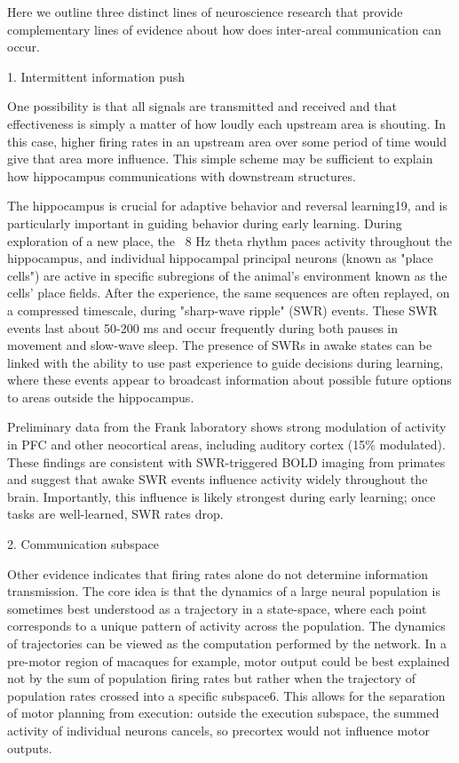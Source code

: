 \documentclass[12pt]{report}
\begin{document}
Here we outline three distinct lines of neuroscience research that provide 
complementary lines of evidence about how does inter-areal communication can
occur.

1. Intermittent information push

One possibility is that all signals are transmitted and received and that
effectiveness is simply a matter of how loudly each upstream area is shouting.
In this case, higher firing rates in an upstream area over some period of time
would give that area more influence. This simple scheme may be sufficient to
explain how hippocampus communications with downstream structures. 

The hippocampus is crucial for adaptive behavior and reversal learning19, and is 
particularly important in guiding behavior during early learning. During
exploration of a new place, the ~8 Hz theta rhythm paces activity throughout
the hippocampus, and individual hippocampal principal neurons (known as "place
cells") are active in specific subregions of the animal's environment known as
the cells' place fields. After the experience, the same sequences are often
replayed, on a compressed timescale, during "sharp-wave ripple" (SWR)
events. These SWR events last about 50-200 ms and occur frequently during
both pauses in movement and slow-wave sleep. The presence of SWRs in awake
states can be linked with the ability to use past experience to guide
decisions during learning, where these events appear to broadcast
information about possible future options to areas outside the hippocampus.

Preliminary data from the Frank laboratory shows strong modulation of activity
in PFC and other neocortical areas, including auditory cortex (15\% modulated).
These findings are consistent with SWR-triggered BOLD imaging from primates
and suggest that awake SWR events influence activity widely
throughout the brain. Importantly, this influence is likely strongest during
early learning; once tasks are well-learned, SWR rates drop.

2. Communication subspace

Other evidence indicates that firing rates alone do not determine information 
transmission. The core idea is that the dynamics of a large neural population
is sometimes best understood as a trajectory in a state-space, where each point 
corresponds to a unique pattern of activity across the population. The dynamics
of trajectories can be viewed as the computation performed by the network.
In a pre-motor region of macaques for example, motor output could be best
explained not by the sum of population firing rates but rather when
the trajectory of population rates crossed into a specific subspace6. This
allows for the separation of motor planning from execution: 
outside the execution subspace, the summed activity of individual neurons
cancels, so precortex would not influence motor outputs.
\end{document}
